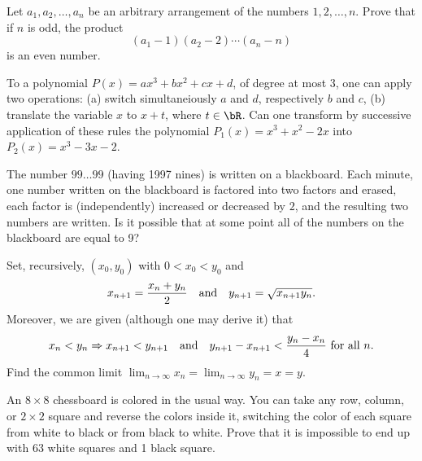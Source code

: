 \documentclass[12pt]{article}
\begin{document}
        \begin{exercise}
            Let \(a_1,a_2,\ldots,a_n\) be an arbitrary arrangement of the numbers \(1,2,\ldots,n\). Prove that if \(n\) is odd, the product
            \[(a_1-1)(a_2-2)\cdots(a_n-n)\]
            is an even number.
        \end{exercise}
    
        \begin{exercise}
            To a polynomial \(P(x)=ax^3+bx^2+cx+d\), of degree at most 3, one can apply two operations: (a) switch simultaneiously \(a\) and \(d\), respectively \(b\) and \(c\), (b) translate the variable \(x\) to \(x+t\), where \(t\in\bR\). Can one transform by successive application of these rules the polynomial \(P_1(x)=x^3+x^2-2x\) into \(P_2(x)=x^3-3x-2\). 
        \end{exercise}
    
        \begin{exercise}
            The number \(99\ldots99\) (having 1997 nines) is written on a blackboard. Each minute, one number written on the blackboard is factored into two factors and erased, each factor is (independently) increased or decreased by \(2\), and the resulting two numbers are written. Is it possible that at some point all of the numbers on the blackboard are equal to 9?
        \end{exercise}

        \begin{exercise}
            Set, recursively, \((x_0,y_0)\) with \(0<x_0<y_0\) and
            \[x_{n+1}=\frac{x_n+y_n}{2}\quad\text{and}\quad y_{n+1}=\sqrt{x_{n+1}y_n}.\]
            Moreover, we are given (although one may derive it) that
            \[x_n<y_n\Rightarrow x_{n+1}<y_{n+1}\quad\text{and}\quad y_{n+1}-x_{n+1}<\frac{y_n-x_n}{4}\text{ for all }n.\]
            Find the common limit \(\displaystyle\lim_{n\to\infty}x_n=\lim_{n\to\infty}y_n=x=y\).
        \end{exercise}

        
        \begin{exercise} %
            An \(8\times 8\) chessboard is colored in the usual way.
            You can take any row, column, or \(2\times2\) square and reverse the colors inside it, switching the color of each square from white to black or from black to white.
            Prove that it is impossible to end up with 63 white squares and 1 black square.
        \end{exercise}
\end{document}
